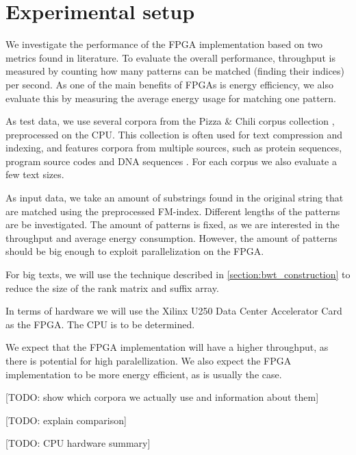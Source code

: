\section{Experimental setup} \label{section:experiment_setup}
We investigate the performance of the FPGA implementation based on two metrics found in literature.
To evaluate the overall performance, throughput is measured by counting how many patterns can be matched (finding their indices) per second.
As one of the main benefits of FPGAs is energy efficiency, we also evaluate this by measuring the average energy usage for matching one pattern.

As test data, we use several corpora from the Pizza \& Chili corpus collection \cite{ferragina_pizzachili_nodate}, preprocessed on the CPU.
This collection is often used for text compression and indexing, and features corpora from multiple sources, such as protein sequences, program source codes and DNA sequences \cite{makinen_compressed_2007}.
For each corpus we also evaluate a few text sizes.

As input data, we take an amount of substrings found in the original string that are matched using the preprocessed FM-index.
Different lengths of the patterns are be investigated.
The amount of patterns is fixed, as we are interested in the throughput and average energy consumption.
However, the amount of patterns should be big enough to exploit parallelization on the FPGA.

For big texts, we will use the technique described in \ref{section:bwt_construction} to reduce the size of the rank matrix and suffix array.

In terms of hardware we will use the Xilinx U250 Data Center Accelerator Card as the FPGA.
The CPU is to be determined.

We expect that the FPGA implementation will have a higher throughput, as there is potential for high paralellization.
We also expect the FPGA implementation to be more energy efficient, as is usually the case.

[TODO: show which corpora we actually use and information about them]

[TODO: explain comparison]

[TODO: CPU hardware summary]

